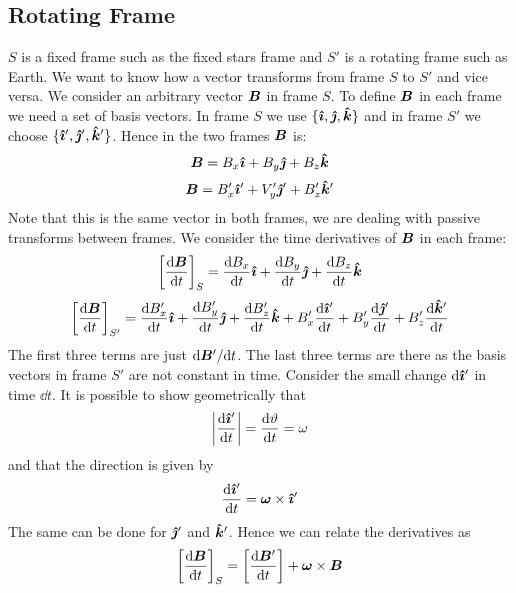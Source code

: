 \documentclass{article}
\newcommand{\vk}{\vh k}
\begin{document}
    \subsection{Rotating Frame}
    \(S\) is a fixed frame such as the fixed stars frame and \(S'\) is a rotating frame such as Earth.
    We want to know how a vector transforms from frame \(S\) to \(S'\) and vice versa.
    We consider an arbitrary vector \(\bm{B}\) in frame \(S\).
    To define \(\bm{B}\) in each frame we need a set of basis vectors.
    In frame \(S\) we use \(\{\vi, \vj, \vk\}\) and in frame \(S'\) we choose \(\{\vi', \vj', \vk'\}\).
    Hence in the two frames \(\bm{B}\) is:
    \[\vv B = B_x\vi + B_y\vj + B_z\vk\]
    \[\vv B = B_x'\vi' + V_y'\vj' + B_z'\vk'\]
    Note that this is the same vector in both frames, we are dealing with passive transforms between frames.
    We consider the time derivatives of \(\bm{B}\) in each frame:
    \[\left[\dv{\vv B}{t}\right]_S = \dv{B_x}{t}\vi + \dv{B_y}{t}\vj + \dv{B_z}{t}\vk\]
    \[\left[\dv{\vv B}{t}\right]_{S'} = \dv{B_x'}{t}\vi + \dv{B_y'}{t}\vj + \dv{B_z'}{t}\vk + B_x'\dv{\vi'}{t} + B_y'\dv{\vj'}{t} + B_z'\dv{\vk'}{t}\]
    The first three terms are just \(\dd\bm{B}'/\dd t\).
    The last three terms are there as the basis vectors in frame \(S'\) are not constant in time.
    Consider the small change \(\dd\bm{\hat{\imath}}'\) in time \(\dd t\).
    It is possible to show geometrically that
    \[\left|\dv{\bm{\hat{\imath}}'}{t}\right| = \dv{\vartheta}{t} = \omega\]
    and that the direction is given by
    \[\dv{\bm{\hat{\imath}}'}{t} = \bm{\omega}\times\bm{\hat{\imath}}'\]
    The same can be done for \(\bm{\hat{\jmath}}'\) and \(\vk'\).
    Hence we can relate the derivatives as
    \[\left[\dv{\bm{B}}{t}\right]_S = \left[\dv{\bm{B}'}{t}\right] + \bm{\omega}\times\bm{B}\]
    
\end{document}
